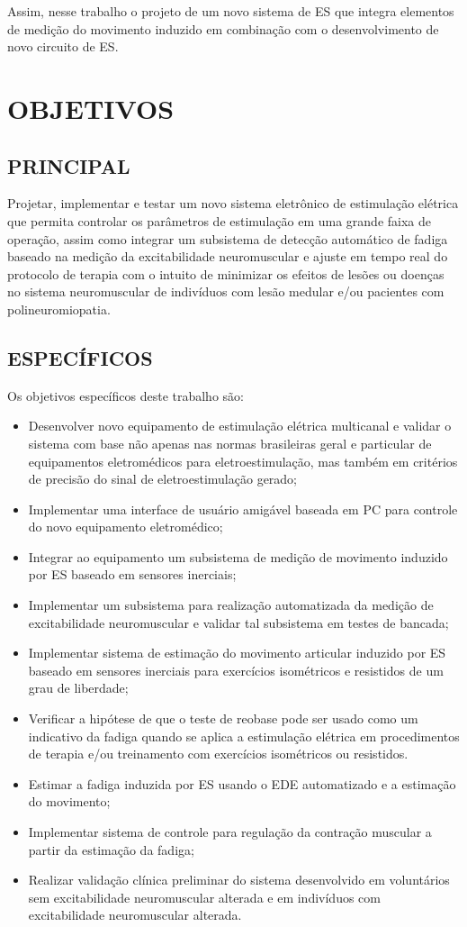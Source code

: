 Assim, nesse trabalho o projeto de um novo sistema de \acrshort{ES} que integra elementos de medição do movimento induzido em combinação com o desenvolvimento de novo circuito de \acrshort{ES}. 

\section{OBJETIVOS}

\subsection{PRINCIPAL}
Projetar, implementar e testar um novo sistema eletrônico de estimulação elétrica que permita controlar os parâmetros de estimulação em uma grande faixa de operação, assim como integrar um subsistema de detecção automático de fadiga baseado na medição da excitabilidade neuromuscular e ajuste em tempo real do protocolo de terapia com o intuito de minimizar os efeitos de lesões ou doenças no sistema neuromuscular de indivíduos com lesão medular e/ou pacientes com polineuromiopatia.  

\subsection{ESPECÍFICOS}
Os objetivos específicos deste trabalho são:
\begin{itemize}
\item Desenvolver novo equipamento de estimulação elétrica multicanal e validar o sistema com base não apenas nas normas brasileiras geral e particular de equipamentos eletromédicos para eletroestimulação, mas também em critérios de precisão do sinal de eletroestimulação gerado;
\item Implementar uma interface de usuário amigável baseada em PC para controle do novo equipamento eletromédico; 
\item Integrar ao equipamento um subsistema de medição de movimento induzido por ES baseado em sensores inerciais;
\item Implementar um subsistema para realização automatizada da medição de excitabilidade neuromuscular e validar tal subsistema em testes de bancada;
\item Implementar sistema de estimação do movimento articular induzido por ES baseado em sensores inerciais para exercícios isométricos e resistidos de um grau de liberdade;
\item Verificar a hipótese de que o teste de reobase pode ser usado como um indicativo da fadiga quando se aplica a estimulação elétrica em procedimentos de terapia e/ou treinamento com exercícios isométricos ou resistidos.
\item Estimar a fadiga induzida por \acrshort{ES} usando o \acrshort{EDE} automatizado e a estimação do movimento;
\item Implementar sistema de controle para regulação da contração muscular a partir da estimação da fadiga;
\item Realizar validação clínica preliminar do sistema desenvolvido em voluntários sem excitabilidade neuromuscular alterada e em indivíduos com excitabilidade neuromuscular alterada.
\end{itemize}

